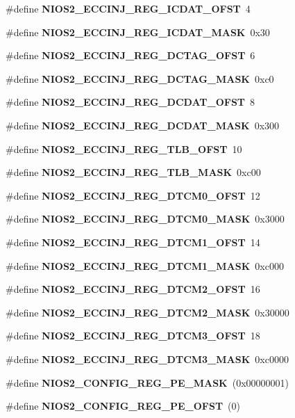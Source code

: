 \begin{DoxyCompactItemize}
\#define {\bf N\+I\+O\+S2\+\_\+\+E\+C\+C\+I\+N\+J\+\_\+\+R\+E\+G\+\_\+\+I\+C\+D\+A\+T\+\_\+\+O\+F\+ST}~4
\item 
\#define {\bf N\+I\+O\+S2\+\_\+\+E\+C\+C\+I\+N\+J\+\_\+\+R\+E\+G\+\_\+\+I\+C\+D\+A\+T\+\_\+\+M\+A\+SK}~0x30
\item 
\#define {\bf N\+I\+O\+S2\+\_\+\+E\+C\+C\+I\+N\+J\+\_\+\+R\+E\+G\+\_\+\+D\+C\+T\+A\+G\+\_\+\+O\+F\+ST}~6
\item 
\#define {\bf N\+I\+O\+S2\+\_\+\+E\+C\+C\+I\+N\+J\+\_\+\+R\+E\+G\+\_\+\+D\+C\+T\+A\+G\+\_\+\+M\+A\+SK}~0xc0
\item 
\#define {\bf N\+I\+O\+S2\+\_\+\+E\+C\+C\+I\+N\+J\+\_\+\+R\+E\+G\+\_\+\+D\+C\+D\+A\+T\+\_\+\+O\+F\+ST}~8
\item 
\#define {\bf N\+I\+O\+S2\+\_\+\+E\+C\+C\+I\+N\+J\+\_\+\+R\+E\+G\+\_\+\+D\+C\+D\+A\+T\+\_\+\+M\+A\+SK}~0x300
\item 
\#define {\bf N\+I\+O\+S2\+\_\+\+E\+C\+C\+I\+N\+J\+\_\+\+R\+E\+G\+\_\+\+T\+L\+B\+\_\+\+O\+F\+ST}~10
\item 
\#define {\bf N\+I\+O\+S2\+\_\+\+E\+C\+C\+I\+N\+J\+\_\+\+R\+E\+G\+\_\+\+T\+L\+B\+\_\+\+M\+A\+SK}~0xc00
\item 
\#define {\bf N\+I\+O\+S2\+\_\+\+E\+C\+C\+I\+N\+J\+\_\+\+R\+E\+G\+\_\+\+D\+T\+C\+M0\+\_\+\+O\+F\+ST}~12
\item 
\#define {\bf N\+I\+O\+S2\+\_\+\+E\+C\+C\+I\+N\+J\+\_\+\+R\+E\+G\+\_\+\+D\+T\+C\+M0\+\_\+\+M\+A\+SK}~0x3000
\item 
\#define {\bf N\+I\+O\+S2\+\_\+\+E\+C\+C\+I\+N\+J\+\_\+\+R\+E\+G\+\_\+\+D\+T\+C\+M1\+\_\+\+O\+F\+ST}~14
\item 
\#define {\bf N\+I\+O\+S2\+\_\+\+E\+C\+C\+I\+N\+J\+\_\+\+R\+E\+G\+\_\+\+D\+T\+C\+M1\+\_\+\+M\+A\+SK}~0xc000
\item 
\#define {\bf N\+I\+O\+S2\+\_\+\+E\+C\+C\+I\+N\+J\+\_\+\+R\+E\+G\+\_\+\+D\+T\+C\+M2\+\_\+\+O\+F\+ST}~16
\item 
\#define {\bf N\+I\+O\+S2\+\_\+\+E\+C\+C\+I\+N\+J\+\_\+\+R\+E\+G\+\_\+\+D\+T\+C\+M2\+\_\+\+M\+A\+SK}~0x30000
\item 
\#define {\bf N\+I\+O\+S2\+\_\+\+E\+C\+C\+I\+N\+J\+\_\+\+R\+E\+G\+\_\+\+D\+T\+C\+M3\+\_\+\+O\+F\+ST}~18
\item 
\#define {\bf N\+I\+O\+S2\+\_\+\+E\+C\+C\+I\+N\+J\+\_\+\+R\+E\+G\+\_\+\+D\+T\+C\+M3\+\_\+\+M\+A\+SK}~0xc0000
\item 
\#define {\bf N\+I\+O\+S2\+\_\+\+C\+O\+N\+F\+I\+G\+\_\+\+R\+E\+G\+\_\+\+P\+E\+\_\+\+M\+A\+SK}~(0x00000001)
\item 
\#define {\bf N\+I\+O\+S2\+\_\+\+C\+O\+N\+F\+I\+G\+\_\+\+R\+E\+G\+\_\+\+P\+E\+\_\+\+O\+F\+ST}~(0)

\end{DoxyCompactItemize}
